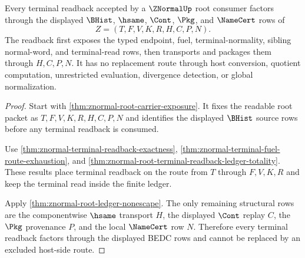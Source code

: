\begin{theorem}
\label{thm:znormal-root-readback-exhaustion}
Every terminal readback accepted by a $\ZNormalUp$ root consumer factors through the displayed $\BHist$, $\hsame$, $\Cont$, $\Pkg$, and $\NameCert$ rows of
$$
Z=(T,F,V,K,R,H,C,P,N).
$$
The readback first exposes the typed endpoint, fuel, terminal-normality, sibling normal-word, and terminal-read rows, then transports and packages them through $H,C,P,N$. It has no replacement route through host conversion, quotient computation, unrestricted evaluation, divergence detection, or global normalization.
\end{theorem}
\begin{proof}
Start with \autoref{thm:znormal-root-carrier-exposure}. It fixes the readable root packet as $T,F,V,K,R,H,C,P,N$ and identifies the displayed $\BHist$ source rows before any terminal readback is consumed.

Use \autoref{thm:znormal-terminal-readback-exactness}, \autoref{thm:znormal-terminal-fuel-route-exhaustion}, and \autoref{thm:znormal-root-terminal-readback-ledger-totality}. These results place terminal readback on the route from $T$ through $F,V,K,R$ and keep the terminal read inside the finite ledger.

Apply \autoref{thm:znormal-root-ledger-nonescape}. The only remaining structural rows are the componentwise $\hsame$ transport $H$, the displayed $\Cont$ replay $C$, the $\Pkg$ provenance $P$, and the local $\NameCert$ row $N$. Therefore every terminal readback factors through the displayed BEDC rows and cannot be replaced by an excluded host-side route.
\end{proof}
